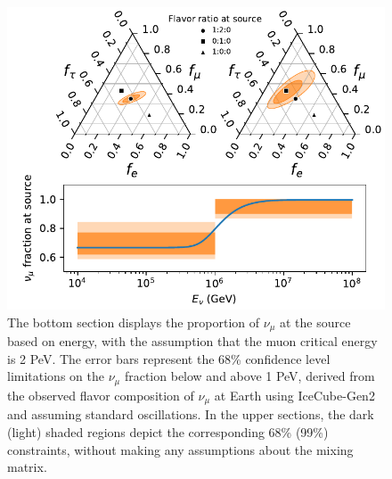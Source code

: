 \begin{figure}[h!]
\centering
    \includegraphics{./figures/gen2/MuonDamped.pdf}
    \caption{The bottom section displays the proportion of $\nu_{\mu}$ at the source based on energy, with the assumption that the muon critical energy is 2 PeV. The error bars represent the 68\% confidence level limitations on the $\nu_{\mu}$ fraction below and above 1 PeV, derived from the observed flavor composition of $\nu_{\mu}$ at Earth using IceCube-Gen2 and assuming standard oscillations. In the upper sections, the dark (light) shaded regions depict the corresponding 68\% (99\%) constraints, without making any assumptions about the mixing matrix.}
\end{figure}